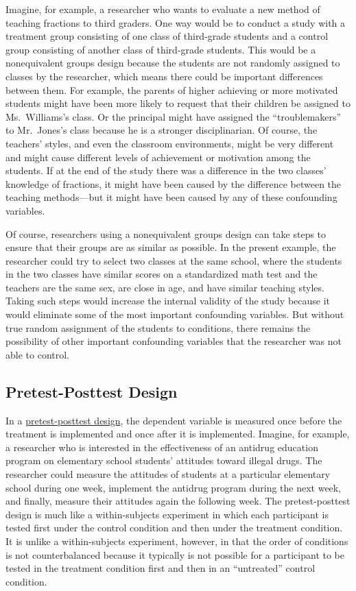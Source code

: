 \documentclass[
]{krantz}
\begin{document}
Imagine, for example, a researcher who wants to evaluate a new method of teaching fractions to third graders. One way would be to conduct a study with a treatment group consisting of one class of third-grade students and a control group consisting of another class of third-grade students. This would be a nonequivalent groups design because the students are not randomly assigned to classes by the researcher, which means there could be important differences between them. For example, the parents of higher achieving or more motivated students might have been more likely to request that their children be assigned to Ms.~Williams's class. Or the principal might have assigned the ``troublemakers'' to Mr.~Jones's class because he is a stronger disciplinarian. Of course, the teachers' styles, and even the classroom environments, might be very different and might cause different levels of achievement or motivation among the students. If at the end of the study there was a difference in the two classes' knowledge of fractions, it might have been caused by the difference between the teaching methods---but it might have been caused by any of these confounding variables.

Of course, researchers using a nonequivalent groups design can take steps to ensure that their groups are as similar as possible. In the present example, the researcher could try to select two classes at the same school, where the students in the two classes have similar scores on a standardized math test and the teachers are the same sex, are close in age, and have similar teaching styles. Taking such steps would increase the internal validity of the study because it would eliminate some of the most important confounding variables. But without true random assignment of the students to conditions, there remains the possibility of other important confounding variables that the researcher was not able to control.

\hypertarget{pretest-posttest-design}{%
\subsection*{Pretest-Posttest Design}\label{pretest-posttest-design}}


In a \protect\hyperlink{pretest-posttest-design-1}{pretest-posttest design}, the dependent variable is measured once before the treatment is implemented and once after it is implemented. Imagine, for example, a researcher who is interested in the effectiveness of an antidrug education program on elementary school students' attitudes toward illegal drugs. The researcher could measure the attitudes of students at a particular elementary school during one week, implement the antidrug program during the next week, and finally, measure their attitudes again the following week. The pretest-posttest design is much like a within-subjects experiment in which each participant is tested first under the control condition and then under the treatment condition. It is unlike a within-subjects experiment, however, in that the order of conditions is not counterbalanced because it typically is not possible for a participant to be tested in the treatment condition first and then in an ``untreated'' control condition.
\end{document}
